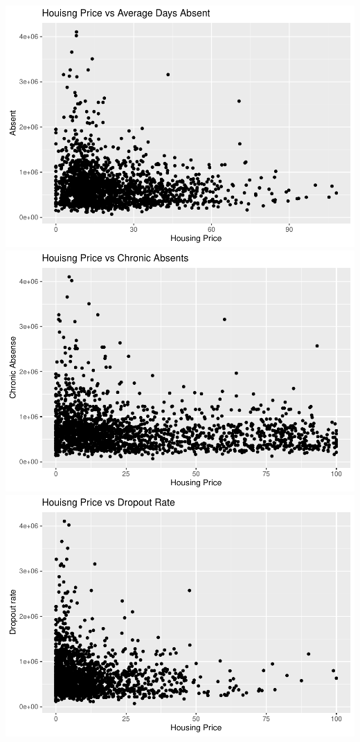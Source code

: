 \documentclass[
]{article}
\begin{document}
\includegraphics{final-writeup_files/figure-latex/unnamed-chunk-3-3.pdf}
\includegraphics{final-writeup_files/figure-latex/unnamed-chunk-3-4.pdf}
\includegraphics{final-writeup_files/figure-latex/unnamed-chunk-3-5.pdf}
\end{document}
